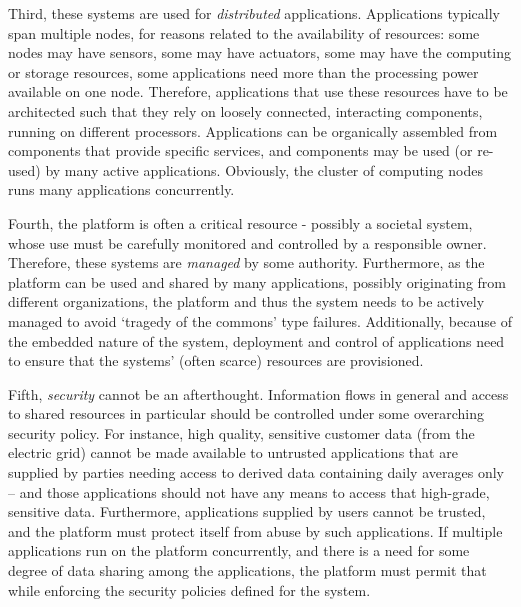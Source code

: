 Third, these systems are used for \textit{distributed}
applications. Applications typically span multiple nodes, for reasons
related to the availability of resources: some nodes may have sensors,
some may have actuators, some may have the computing or storage
resources, some applications need more than the processing power
available on one node. Therefore, applications that use these resources
have to be architected such that they rely on loosely connected,
interacting components, running on different processors. Applications
can be organically assembled from components that provide specific
services, and components may be used (or re-used) by many active
applications. Obviously, the cluster of computing nodes runs
many applications concurrently.

Fourth, the platform is often a critical resource - possibly a
societal system, whose use must be carefully monitored and controlled
by a responsible owner. Therefore, these systems are \textit{managed} by some authority. Furthermore, as the
platform can be used and shared by many applications, possibly originating from
different organizations, the  platform and thus the system needs to be actively managed 
to avoid `tragedy of the commons'
type failures. Additionally, because of the embedded nature of the system,  deployment and control of applications need to ensure that the 
systems' (often scarce) resources are provisioned. 



Fifth, \textit{security} cannot be an afterthought. Information flows in
general and access to shared resources in particular should be
controlled under some overarching security policy. For instance, high
quality, sensitive customer data (from the electric grid) cannot be
made available to untrusted applications that are supplied by parties
needing access to derived data containing daily averages only -- and
those applications should not have any means to access that high-grade,
sensitive data. Furthermore, applications supplied by users cannot be
trusted, and the platform must protect itself from abuse by such
applications. If multiple applications run on the platform
concurrently, and there is a need for some degree of data sharing
among the applications, the platform must permit that while enforcing
the security policies defined for the system.

